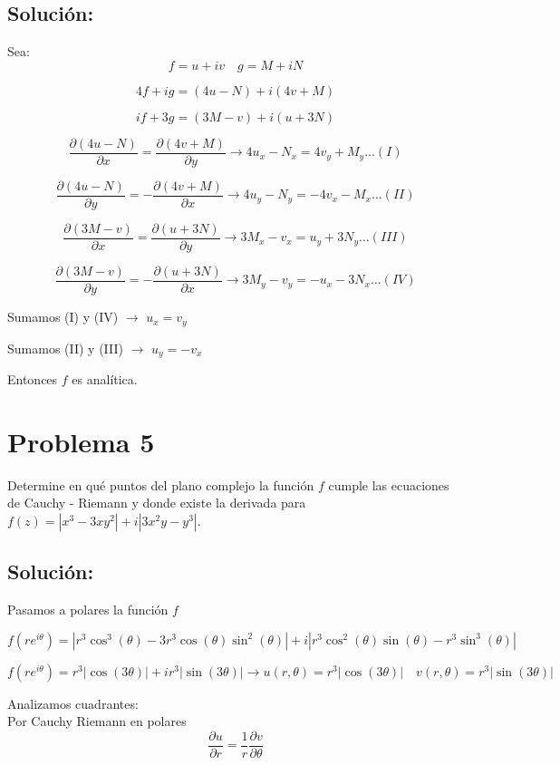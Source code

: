 \documentclass[a4paper,12pt]{article}
\begin{document}
\subsection*{Solución:}
Sea:
\[
f = u + iv \quad g = M + iN
\]

\[
4f + ig = (4u - N) + i(4v + M)
\]

\[
if + 3g = (3M - v) + i(u + 3N)
\]

\[
\frac{\partial (4u - N)}{\partial x} = \frac{\partial (4v + M)}{\partial y} \rightarrow 4u_x - N_x = 4v_y + M_y \ldots (I)
\]

\[
\frac{\partial (4u - N)}{\partial y} = -\frac{\partial (4v + M)}{\partial x} \rightarrow 4u_y - N_y = -4v_x - M_x \ldots (II)
\]

\[
\frac{\partial (3M - v)}{\partial x} = \frac{\partial (u + 3N)}{\partial y} \rightarrow 3M_x - v_x = u_y + 3N_y \ldots (III)
\]

\[
\frac{\partial (3M - v)}{\partial y} = -\frac{\partial (u + 3N)}{\partial x} \rightarrow 3M_y - v_y = -u_x - 3N_x \ldots (IV)
\]

Sumamos (I) y (IV) \(\rightarrow\) \(u_x = v_y\)

Sumamos (II) y (III) \(\rightarrow\) \(u_y = -v_x\)

Entonces \( f \) es analítica.

\section*{Problema 5}
Determine en qué puntos del plano complejo la función \( f \) cumple las ecuaciones de Cauchy - Riemann y donde existe la derivada para \( f(z) = |x^3 - 3xy^2| + i|3x^2y - y^3| \).

\subsection*{Solución:}

Pasamos a polares la función \( f \)

\[
f(re^{i\theta}) = |r^3 \cos^3(\theta) - 3r^3 \cos(\theta) \sin^2(\theta)| + i|r^3 \cos^2(\theta) \sin(\theta) - r^3 \sin^3(\theta)|
\]

\[
f(re^{i\theta}) = r^3|\cos(3\theta)| + ir^3|\sin(3\theta)| \rightarrow u{(r,\theta)} = r^3|\cos(3\theta)| \quad v{(r,\theta)} = r^3|\sin(3\theta)|
\]

Analizamos cuadrantes:\\
 
Por Cauchy Riemann en polares
\[
\frac{\partial u}{\partial r} = \frac{1}{r}\frac{\partial v}{\partial \theta}  
\]
\end{document}
